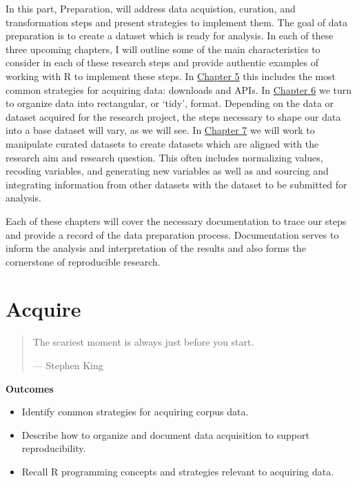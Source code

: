 \documentclass[
  letterpaper,
]{latex/krantz}
\providecommand{\tightlist}{%
  \setlength{\itemsep}{0pt}\setlength{\parskip}{0pt}}\usepackage{longtable,booktabs,array}
\theoremstyle{definition}
\theoremstyle{remark}
\begin{document}
In this part, Preparation, will address data acquistion, curation, and
transformation steps and present strategies to implement them. The goal
of data preparation is to create a dataset which is ready for analysis.
In each of these three upcoming chapters, I will outline some of the
main characteristics to consider in each of these research steps and
provide authentic examples of working with R to implement these steps.
In \hyperref[sec-acquire-chapter]{Chapter 5} this includes the most
common strategies for acquiring data: downloads and APIs. In
\hyperref[sec-curate-data]{Chapter 6} we turn to organize data into
rectangular, or `tidy', format. Depending on the data or dataset
acquired for the research project, the steps necessary to shape our data
into a base dataset will vary, as we will see. In
\hyperref[sec-transform-data]{Chapter 7} we will work to manipulate
curated datasets to create datasets which are aligned with the research
aim and research question. This often includes normalizing values,
recoding variables, and generating new variables as well as and sourcing
and integrating information from other datasets with the dataset to be
submitted for analysis.

Each of these chapters will cover the necessary documentation to trace
our steps and provide a record of the data preparation process.
Documentation serves to inform the analysis and interpretation of the
results and also forms the cornerstone of reproducible research.

\chapter{Acquire}\label{sec-acquire-chapter}

\begin{quote}
The scariest moment is always just before you start.

--- Stephen King
\end{quote}

\begin{tcolorbox}[enhanced jigsaw, bottomrule=.15mm, leftrule=.75mm, toprule=.15mm, breakable, colframe=quarto-callout-color-frame, arc=.35mm, left=2mm, rightrule=.15mm, opacityback=0, colback=white]

\textbf{ Outcomes}

\begin{itemize}
\tightlist
\item
  Identify common strategies for acquiring corpus data.
\item
  Describe how to organize and document data acquisition to support
  reproducibility.
\item
  Recall R programming concepts and strategies relevant to acquiring
  data.
\end{itemize}

\end{tcolorbox}
\end{document}
